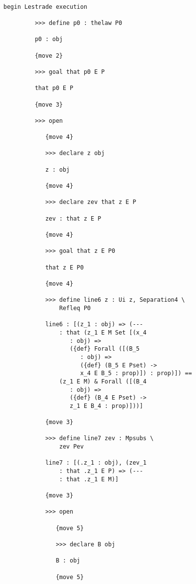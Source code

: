 \documentclass[12pt]{article}
\begin{document}
\begin{verbatim}

begin Lestrade execution

         >>> define p0 : thelaw P0

         p0 : obj

         {move 2}

         >>> goal that p0 E P

         that p0 E P

         {move 3}

         >>> open

            {move 4}

            >>> declare z obj

            z : obj

            {move 4}

            >>> declare zev that z E P

            zev : that z E P

            {move 4}

            >>> goal that z E P0

            that z E P0

            {move 4}

            >>> define line6 z : Ui z, Separation4 \
                Refleq P0

            line6 : [(z_1 : obj) => (--- 
                : that (z_1 E M Set [(x_4 
                   : obj) => 
                   ({def} Forall ([(B_5 
                      : obj) => 
                      ({def} (B_5 E Pset) -> 
                      x_4 E B_5 : prop)]) : prop)]) == 
                (z_1 E M) & Forall ([(B_4 
                   : obj) => 
                   ({def} (B_4 E Pset) -> 
                   z_1 E B_4 : prop)]))]

            {move 3}

            >>> define line7 zev : Mpsubs \
                zev Pev

            line7 : [(.z_1 : obj), (zev_1 
                : that .z_1 E P) => (--- 
                : that .z_1 E M)]

            {move 3}

            >>> open

               {move 5}

               >>> declare B obj

               B : obj

               {move 5}


\end{verbatim}
\end{document}
